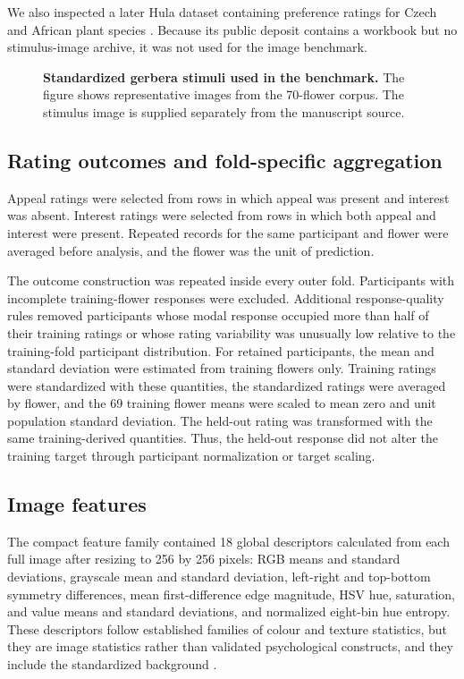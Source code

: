 \documentclass[10pt,letterpaper]{article}
\begin{document}
We also inspected a later Hula dataset containing preference ratings for Czech and African plant species \cite{hulaflegr2020data}. Because its public deposit contains a workbook but no stimulus-image archive, it was not used for the image benchmark.

\begin{figure}[!h]
\caption{\textbf{Standardized gerbera stimuli used in the benchmark.} The figure shows representative images from the 70-flower corpus. The stimulus image is supplied separately from the manuscript source.}
\label{fig:stimuli}
\end{figure}

\subsection*{Rating outcomes and fold-specific aggregation}
Appeal ratings were selected from rows in which appeal was present and interest was absent. Interest ratings were selected from rows in which both appeal and interest were present. Repeated records for the same participant and flower were averaged before analysis, and the flower was the unit of prediction.

The outcome construction was repeated inside every outer fold. Participants with incomplete training-flower responses were excluded. Additional response-quality rules removed participants whose modal response occupied more than half of their training ratings or whose rating variability was unusually low relative to the training-fold participant distribution. For retained participants, the mean and standard deviation were estimated from training flowers only. Training ratings were standardized with these quantities, the standardized ratings were averaged by flower, and the 69 training flower means were scaled to mean zero and unit population standard deviation. The held-out rating was transformed with the same training-derived quantities. Thus, the held-out response did not alter the training target through participant normalization or target scaling.

\subsection*{Image features}
The compact feature family contained 18 global descriptors calculated from each full image after resizing to 256 by 256 pixels: RGB means and standard deviations, grayscale mean and standard deviation, left-right and top-bottom symmetry differences, mean first-difference edge magnitude, HSV hue, saturation, and value means and standard deviations, and normalized eight-bin hue entropy. These descriptors follow established families of colour and texture statistics, but they are image statistics rather than validated psychological constructs, and they include the standardized background \cite{haralick1973,tamura1978,bianconi2021}.
\end{document}
